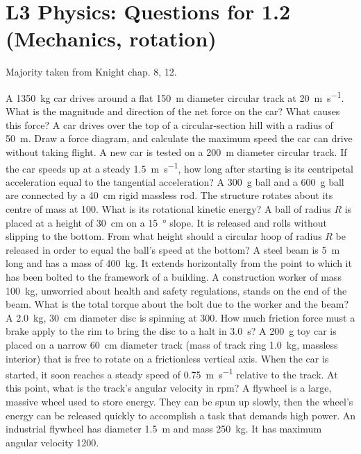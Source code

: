 \documentclass[a4paper]{exam}
\begin{document}
  \section*{L3 Physics: Questions for 1.2 (Mechanics, rotation)}
  Majority taken from Knight chap. 8, 12.
  \begin{questions}
    \question A \SI{1350}{\kilo\gram} car drives around a flat \SI{150}{\metre} diameter circular track at \SI{20}{\metre\per\second}.
              What is the magnitude and direction of the net force on the car? What causes this force?
    \question A car drives over the top of a circular-section hill with a radius of \SI{50}{\metre}. Draw a force diagram, and calculate
              the maximum speed the car can drive without taking flight.
    \question A new car is tested on a \SI{200}{\metre} diameter circular track. If the car speeds up at a steady \SI{1.5}{\metre\per\second},
              how long after starting is its centripetal acceleration equal to the tangential acceleration?
    \question A \SI{300}{\gram} ball and a \SI{600}{\gram} ball are connected by a \SI{40}{\centi\metre} rigid massless rod. The structure rotates
              about its centre of mass at \SI{100}{\rpm}. What is its rotational kinetic energy?
    \question A ball of radius $ R $ is placed at a height of \SI{30}{\centi\metre} on a \SI{15}{\degree} slope. It is released and rolls
              without slipping to the bottom. From what height should a circular hoop of radius $ R $ be released in order to equal the
              ball's speed at the bottom?
    \question A steel beam is \SI{5}{\metre} long and has a mass of \SI{400}{\kilo\gram}. It extends horizontally
              from the point to which it has been bolted to the framework of a building. A construction worker of mass \SI{100}{\kg}, unworried
              about health and safety regulations, stands on the end of the beam. What is the total torque about the bolt due to the worker
              and the beam?
    \question A \SI{2.0}{\kilo\gram}, \SI{30}{\centi\metre} diameter disc is spinning at \SI{300}{\rpm}. How much friction force must a brake
              apply to the rim to bring the disc to a halt in \SI{3.0}{\second}?
    \question A \SI{200}{\gram} toy car is placed on a narrow \SI{60}{\centi\metre} diameter track (mass of track ring \SI{1.0}{\kilo\gram},
              massless interior) that is free to rotate on a frictionless vertical axis. When the car is started, it soon reaches a steady
              speed of \SI{0.75}{\metre\per\second} relative to the track. At this point, what is the track's angular velocity in rpm?
    \question A flywheel is a large, massive wheel used to store energy. They can be spun up slowly, then the wheel's energy can be released
              quickly to accomplish a task that demands high power. An industrial flywheel has diameter \SI{1.5}{\metre} and mass \SI{250}{\kilo\gram}.
              It has maximum angular velocity \SI{1200}{\rpm}.
      \begin{parts}

\end{parts}
\end{questions}
\end{document}
